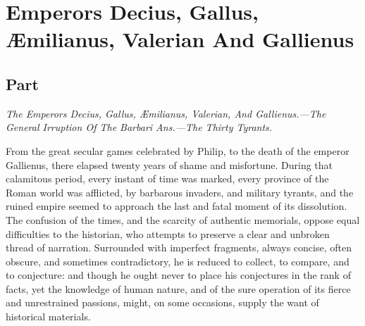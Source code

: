 \chapter{Emperors Decius, Gallus, Æmilianus, Valerian And Gallienus}
\section{Part \thesection}

\textit{The Emperors Decius, Gallus, Æmilianus, Valerian, And
Gallienus.—The General Irruption Of The Barbari Ans.—The Thirty
Tyrants.}
\vspace{\onelineskip}

From the great secular games celebrated by Philip, to the death
of the emperor Gallienus, there elapsed twenty years of shame and
misfortune. During that calamitous period, every instant of time
was marked, every province of the Roman world was afflicted, by
barbarous invaders, and military tyrants, and the ruined empire
seemed to approach the last and fatal moment of its dissolution.
The confusion of the times, and the scarcity of authentic
memorials, oppose equal difficulties to the historian, who
attempts to preserve a clear and unbroken thread of narration.
Surrounded with imperfect fragments, always concise, often
obscure, and sometimes contradictory, he is reduced to collect,
to compare, and to conjecture: and though he ought never to place
his conjectures in the rank of facts, yet the knowledge of human
nature, and of the sure operation of its fierce and unrestrained
passions, might, on some occasions, supply the want of historical
materials.

